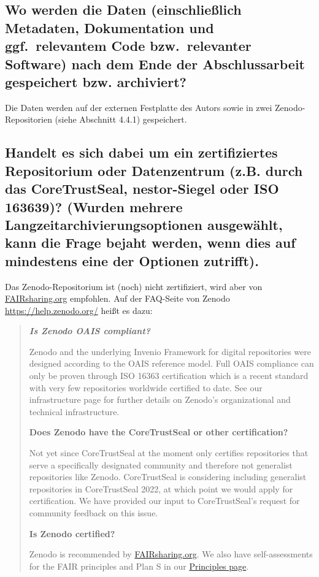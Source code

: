 \documentclass[%
  11pt,
  DIV=16,
  a4paper,
  BCOR=15mm,
  twoside=on,
  bibliography=totoc,
  headings=normal,
  numbers=noendperiod,
]{scrartcl}
\begin{document}
\subsection{Wo werden die Daten (einschließlich Metadaten, Dokumentation und ggf.\ relevantem Code bzw.\ relevanter Software) nach dem Ende der Abschlussarbeit gespeichert bzw. archiviert?}

Die Daten werden auf der externen Festplatte des Autors
sowie in zwei Zenodo-Repositorien (siehe Abschnitt 4.4.1) gespeichert.

\subsection{Handelt es sich dabei um ein zertifiziertes Repositorium oder Datenzentrum (z.B. durch das CoreTrustSeal, nestor-Siegel oder ISO 163639)? (Wurden mehrere Langzeitarchivierungsoptionen ausgewählt, kann die Frage bejaht werden, wenn dies auf mindestens eine der Optionen zutrifft).}

Das Zenodo-Repositorium ist (noch) nicht zertifiziert, wird aber von \href{https://fairsharing.org/}{FAIRsharing.org} empfohlen.
Auf der FAQ-Seite von Zenodo \url{https://help.zenodo.org/} heißt es dazu:

\begin{quote}
  \itshape
  \textbf{\textsf{Is Zenodo OAIS compliant?}}
  
  Zenodo and the underlying Invenio Framework for digital repositories were designed according to the OAIS reference model. Full OAIS compliance can only be proven through ISO 16363 certification which is a recent standard with very few repositories worldwide certified to date. See our infrastructure page for further details on Zenodo’s organizational and technical infrastructure.
  
  \textbf{\textsf{Does Zenodo have the CoreTrustSeal or other certification?}}
  
  Not yet since CoreTrustSeal at the moment only certifies repositories that serve a specifically designated community and therefore not generalist repositories like Zenodo. CoreTrustSeal is considering including generalist repositories in CoreTrustSeal 2022, at which point we would apply for certification. We have provided our input to CoreTrustSeal’s request for community feedback on this issue.
  
  \textbf{\textsf{Is Zenodo certified?}}
  
  Zenodo is recommended by \href{https://fairsharing.org/}{FAIRsharing.org}. We also have self-assessments for the FAIR principles and Plan S in our \href{https://about.zenodo.org/principles/}{Principles page}.
\end{quote}
\end{document}
